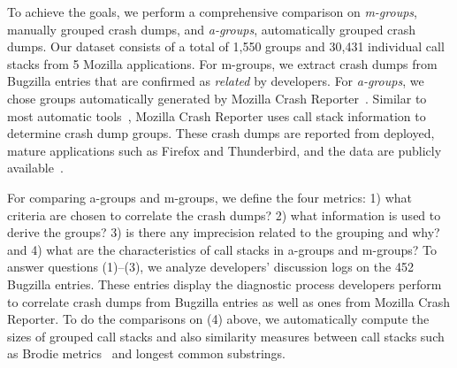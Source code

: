 To achieve the goals, we perform a comprehensive comparison on {\it m-groups}, manually grouped crash dumps, and {\it a-groups}, automatically grouped crash dumps. Our dataset consists of a total of 1,550 groups and 30,431 individual call stacks from 5 Mozilla applications. For m-groups, we extract crash dumps from Bugzilla entries that are confirmed as {\it related} by developers. For {\it a-groups}, we chose groups automatically generated by Mozilla Crash Reporter~\cite{mozilla}. Similar to most automatic tools~\cite{Bartz_findingsimilar,brodie:automated,4401026}, Mozilla Crash Reporter uses call stack information to determine crash dump groups. These crash dumps are reported from deployed, mature applications such as Firefox and Thunderbird, and the data are publicly available~\cite{firefox}.

\begin{table*}
\centering
\caption{Summary of our Findings\label{tab:findings}}
\end{table*}

For comparing a-groups and m-groups, we define the four metrics: 1) what criteria are chosen to correlate the crash dumps? 2) what information is used to derive the groups? 3) is there any imprecision related to the grouping and why? and 4) what are the characteristics of call stacks in a-groups and m-groups? To answer questions (1)--(3), we analyze developers' discussion logs on the 452 Bugzilla entries. These entries display the diagnostic process developers perform to correlate crash dumps from Bugzilla entries as well as ones from Mozilla Crash Reporter. To do the comparisons on (4) above, we automatically compute the sizes of grouped call stacks and also similarity measures between call stacks such as Brodie metrics~\cite{brodie:quickly} and longest common substrings.

